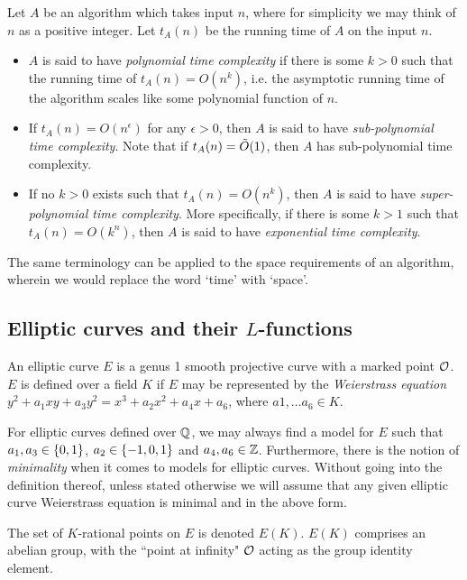 \begin{definition}
Let $A$ be an algorithm which takes input $n$, where for simplicity we may think of $n$ as a positive integer. Let $t_A(n)$ be the running time of $A$ on the input $n$.
\begin{itemize}
\item $A$ is said to have {\it polynomial time complexity} if there is some $k>0$ such that the running time of $t_A(n) = O(n^{k})$, i.e. the asymptotic running time of the algorithm scales like some polynomial function of $n$.
\item If $t_A(n) = O(n^{\epsilon})$ for any $\epsilon>0$, then $A$ is said to have {\it sub-polynomial time complexity}. Note that if $t_A(n) = \tilde{O}(1)$, then $A$ has sub-polynomial time complexity.
\item If no $k>0$ exists such that $t_A(n) = O(n^k)$, then $A$ is said to have {\it super-polynomial time complexity}. More specifically, if there is some $k>1$ such that $t_A(n) = O(k^n)$, then $A$ is said to have {\it exponential time complexity}.
\end{itemize}
\end{definition}
The same terminology can be applied to the space requirements of an algorithm, wherein we would replace the word `time' with `space'.


\subsection{Elliptic curves and their $L$-functions}

\begin{definition}
An elliptic curve $E$ is a genus 1 smooth projective curve with a marked point $\mathcal{O}$. $E$ is defined over a field $K$ if $E$ may be represented by the {\it Weierstrass equation} $y^2 + a_1 xy + a_3 y^2 = x^3 + a_2 x^2 + a_4 x + a_6$, where $a1,\ldots a_6 \in K$.
\end{definition}

For elliptic curves defined over $\mathbb{Q}$, we may always find a model for $E$ such that $a_1, a_3 \in \left\{0,1\right\}$, $a_2 \in \left\{-1,0,1\right\}$ and $a_4,a_6 \in \mathbb{Z}$. Furthermore, there is the notion of {\it minimality} when it comes to models for elliptic curves. Without going into the definition thereof, unless stated otherwise we will assume that any given elliptic curve Weierstrass equation is minimal and in the above form.

\begin{definition}
The set of $K$-rational points on $E$ is denoted $E(K)$. $E(K)$ comprises an abelian group, with the ``point at infinity" $\mathcal{O}$ acting as the group identity element.
\end{definition}

